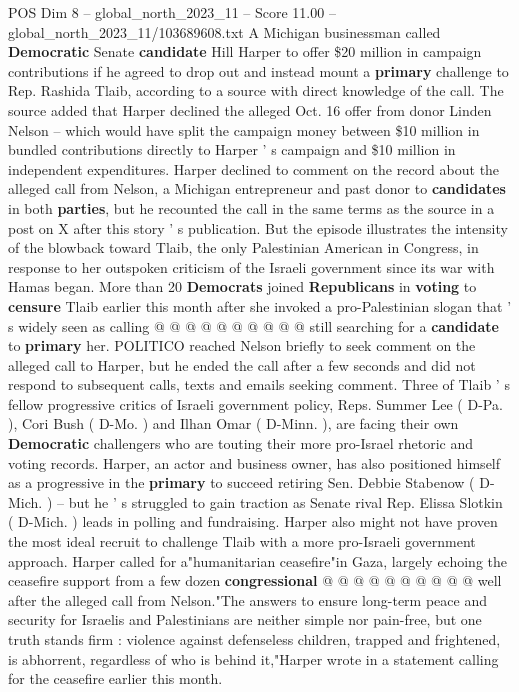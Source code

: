 \begin{textsample}{POS Dim 8 – global\_north\_2023\_11 – Score 11.00 – global\_north\_2023\_11/103689608.txt}  \label{ex:f8_pos_123}
A Michigan businessman called \textbf{Democratic} Senate \textbf{candidate} Hill Harper to offer \$20 million in campaign contributions if he agreed to drop out and instead mount a \textbf{primary} challenge to Rep.
Rashida Tlaib, according to a source with direct knowledge of the call.
The source added that Harper declined the alleged Oct. 16 offer from donor Linden Nelson -- which would have split the campaign money between \$10 million in bundled contributions directly to Harper ' s campaign and \$10 million in independent expenditures.
Harper declined to comment on the record about the alleged call from Nelson, a Michigan entrepreneur and past donor to \textbf{candidates} in both \textbf{parties}, but he recounted the call in the same terms as the source in a post on X after this story ' s publication.
But the episode illustrates the intensity of the blowback toward Tlaib, the only Palestinian American in Congress, in response to her outspoken criticism of the Israeli government since its war with Hamas began.
More than 20 \textbf{Democrats} joined \textbf{Republicans} in \textbf{voting} to \textbf{censure} Tlaib earlier this month after she invoked a pro-Palestinian slogan that ' s widely seen as calling @ @ @ @ @ @ @ @ @ @ still searching for a \textbf{candidate} to \textbf{primary} her.
POLITICO reached Nelson briefly to seek comment on the alleged call to Harper, but he ended the call after a few seconds and did not respond to subsequent calls, texts and emails seeking comment.
Three of Tlaib ' s fellow progressive critics of Israeli government policy, Reps.
Summer Lee ( D-Pa. ), Cori Bush ( D-Mo. ) and Ilhan Omar ( D-Minn. ), are facing their own \textbf{Democratic} challengers who are touting their more pro-Israel rhetoric and voting records.
Harper, an actor and business owner, has also positioned himself as a progressive in the \textbf{primary} to succeed retiring Sen.
Debbie Stabenow ( D-Mich. ) -- but he ' s struggled to gain traction as Senate rival Rep.
Elissa Slotkin ( D-Mich. ) leads in polling and fundraising.
Harper also might not have proven the most ideal recruit to challenge Tlaib with a more pro-Israeli government approach.
Harper called for a"humanitarian ceasefire"in Gaza, largely echoing the ceasefire support from a few dozen \textbf{congressional} @ @ @ @ @ @ @ @ @ @ well after the alleged call from Nelson."The answers to ensure long-term peace and security for Israelis and Palestinians are neither simple nor pain-free, but one truth stands firm : violence against defenseless children, trapped and frightened, is abhorrent, regardless of who is behind it,"Harper wrote in a statement calling for the ceasefire earlier this month.

\end{textsample}
